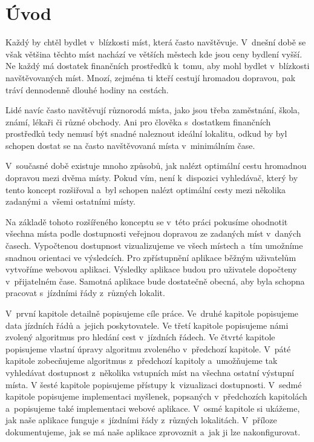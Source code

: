 \chapter*{Úvod}

Každý by chtěl bydlet v~blízkosti míst, která často navštěvuje. V~dnešní době se však většina těchto míst nachází ve větších městech kde jsou ceny bydlení vyšší. Ne každý má dostatek finančních prostředků k~tomu, aby mohl bydlet v~blízkosti navštěvovaných míst. Mnozí, zejména ti kteří cestují hromadou dopravou, pak tráví dennodenně dlouhé hodiny na cestách.

Lidé navíc často navštěvují různorodá místa, jako jsou třeba zaměstnání, škola, známí, lékaři či různé obchody. Ani pro člověka s~dostatkem finančních prostředků tedy nemusí být snadné naleznout ideální lokalitu, odkud by byl schopen dostat se na často navštěvovaná místa v~minimálním čase.

V~současné době existuje mnoho způsobů, jak nalézt optimální cestu hromadnou dopravou mezi dvěma místy. Pokud vím, není k~dispozici vyhledávač, který by tento koncept rozšiřoval a~byl schopen nalézt optimální cesty mezi několika zadanými a~všemi ostatními místy.

Na základě tohoto rozšířeného konceptu se v~této práci pokusíme ohodnotit všechna místa podle dostupnosti veřejnou dopravou ze zadaných míst v~daných časech. Vypočtenou dostupnost vizualizujeme ve všech místech a~tím umožníme snadnou orientaci ve výsledcích. Pro zpřístupnění aplikace běžným uživatelům vytvoříme webovou aplikaci. Výsledky aplikace budou pro uživatele dopočteny v~přijatelném čase. Samotná aplikace bude dostatečně obecná, aby byla schopna pracovat s~jízdními řády z~různých lokalit.

V~první kapitole detailně popisujeme cíle práce.
Ve~druhé kapitole popisujeme data jízdních řádů a~jejich poskytovatele.
Ve třetí kapitole popisujeme námi zvolený algoritmus pro hledání cest v~jízdních řádech.
Ve čtvrté kapitole popisujeme vlastní úpravy algoritmu zvoleného v~předchozí kapitole.
V~páté kapitole zobecňujeme algoritmus z~předchozí kapitoly a~umožňujeme tak vyhledávat dostupnost z~několika vstupních míst na všechna ostatní výstupní místa.
V šesté kapitole popisujeme přístupy k~vizualizaci dostupnosti.
V~sedmé kapitole popisujeme implementaci myšlenek, popsaných v~předchozích kapitolách a~popisujeme také implementaci webové aplikace.
V~osmé kapitole si ukážeme, jak naše aplikace funguje s~jízdními řády z~různých lokalitách.
V~příloze dokumentujeme, jak se má naše aplikace zprovoznit a~jak ji lze nakonfigurovat.

